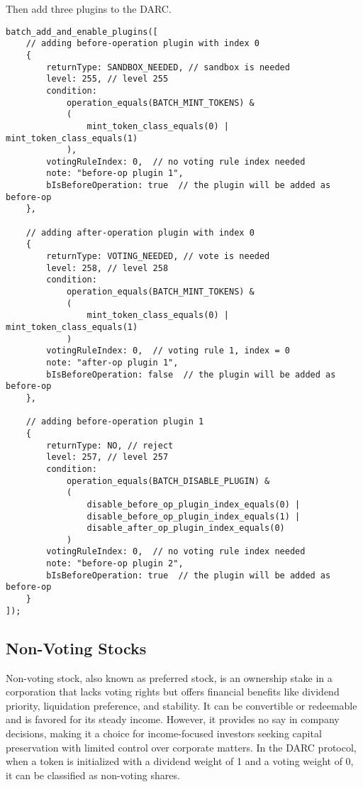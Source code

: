 \documentclass[main.tex]{subfiles}
\begin{document}
Then add three plugins to the DARC. 
\begin{verbatim}
batch_add_and_enable_plugins([
    // adding before-operation plugin with index 0
    {
        returnType: SANDBOX_NEEDED, // sandbox is needed
        level: 255, // level 255
        condition:
            operation_equals(BATCH_MINT_TOKENS) & 
            ( 
                mint_token_class_equals(0) | mint_token_class_equals(1)
            ),
        votingRuleIndex: 0,  // no voting rule index needed
        note: "before-op plugin 1",
        bIsBeforeOperation: true  // the plugin will be added as before-op
    },

    // adding after-operation plugin with index 0
    {
        returnType: VOTING_NEEDED, // vote is needed
        level: 258, // level 258
        condition:
            operation_equals(BATCH_MINT_TOKENS) & 
            ( 
                mint_token_class_equals(0) | mint_token_class_equals(1)
            )
        votingRuleIndex: 0,  // voting rule 1, index = 0
        note: "after-op plugin 1",
        bIsBeforeOperation: false  // the plugin will be added as before-op
    },

    // adding before-operation plugin 1
    {
        returnType: NO, // reject
        level: 257, // level 257
        condition:
            operation_equals(BATCH_DISABLE_PLUGIN) & 
            ( 
                disable_before_op_plugin_index_equals(0) | 
                disable_before_op_plugin_index_equals(1) |
                disable_after_op_plugin_index_equals(0)
            )
        votingRuleIndex: 0,  // no voting rule index needed
        note: "before-op plugin 2",
        bIsBeforeOperation: true  // the plugin will be added as before-op
    }
]);
\end{verbatim}

\subsection{Non-Voting Stocks}

Non-voting stock, also known as preferred stock, is an ownership stake in a corporation that lacks voting rights but offers financial benefits like dividend priority, liquidation preference, and stability. It can be convertible or redeemable and is favored for its steady income. However, it provides no say in company decisions, making it a choice for income-focused investors seeking capital preservation with limited control over corporate matters. In the DARC protocol, when a token is initialized with a dividend weight of 1 and a voting weight of 0, it can be classified as non-voting shares.
\end{document}
